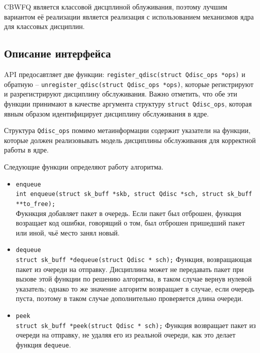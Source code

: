 	CBWFQ является классовой дисцплиной облуживания, поэтому лучшим вариантом
	её реализации является реализация с использованием механизмов ядра для
	классовых дисциплин.

	\subsection{Описание интерфейса}

	API предосавтляет две функции: \lstinline{register_qdisc(struct Qdisc_ops *ops)}
	и обратную -- \lstinline{unregister_qdisc(struct Qdisc_ops *ops)}, которые регистрируют
	и разрегистрируют дисциплину обслуживания. Важно отметить, что обе эти
	функции принимают в качестве аргумента структуру \lstinline{struct Qdisc_ops},
	которая явным образом идентифицирует дисциплину обслуживания в ядре.

	Структура \texttt{Qdisc\_ops} помимо метаинформации содержит указатели на функции,
	которые должен реализовывать модель дисциплины обслуживания для корректной
	работы в ядре. 

	Следующие функции определяют работу алгоритма.
	\begin{itemize}
		\item \lstinline{enqueue}\\
   		    \lstinline{int enqueue(struct sk_buff *skb, struct Qdisc *sch, struct sk_buff **to_free);} \\
			Фукнкция добавляет пакет в очередь. Если пакет был отброшен, функция
			возращает код ошибки, говорящий о том, был отброшен пришедший пакет или
			иной, чьё место занял новый.
		\item \lstinline{dequeue}\\
			\lstinline{struct sk_buff *dequeue(struct Qdisc * sch);}
			Функция, возвращающая пакет из очереди на отправку. Дисциплина
			может не передавать пакет при вызове этой функции по решению
			алгоритма, в таком случае вернув нулевой указатель; 
			однако то же значение алгоритм возвращает в случае, если очередь
			пуста, поэтому в таком случае дополнительно проверяется длина
			очереди.
		\item \lstinline{peek}\\
			\lstinline{struct sk_buff *peek(struct Qdisc * sch);}
			Функция возвращает пакет из очереди на отправку, не удаляя его из реальной очереди,
			как это делает функция \lstinline{dequeue}.
	\end{itemize}

